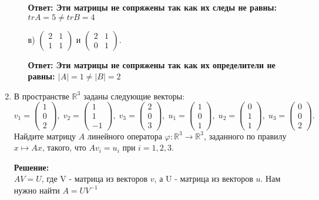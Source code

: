 \documentclass[a4paper,12pt]{article}
\newcounter{z}
\begin{document}
\begin{enumerate}
\begin{itemize}
\textbf{Ответ: Эти матрицы не сопряжены так как их следы не равны: $tr A = 5 \neq tr B = 4 $}


\item[в)] $\begin{pmatrix}{2}&{1}\\{1}&{1}\end{pmatrix}$ и $\begin{pmatrix}{2}&{1}\\{0}&{1}\end{pmatrix}$.

\textbf{Ответ: Эти матрицы не сопряжены так как их определители не равны: $|A| = 1 \neq |B| = 2 $}


\end{itemize}

\vspace{5pt}


\item В пространстве $\mathbb R^3$ заданы следующие векторы:
\[
v_1 =
\begin{pmatrix}
{1}\\{0}\\{2}
\end{pmatrix}
,\;
v_2 =
\begin{pmatrix}
{1}\\{1}\\{-1}
\end{pmatrix}
,\;
v_3 =
\begin{pmatrix}
{2}\\{0}\\{3}
\end{pmatrix}
,\;
u_1 =
\begin{pmatrix}
{1}\\{0}\\{1}
\end{pmatrix}
,\;
u_2 =
\begin{pmatrix}
{0}\\{1}\\{1}
\end{pmatrix}
,\;
u_3 =
\begin{pmatrix}
{0}\\{0}\\{2}
\end{pmatrix}.
\]
Найдите матрицу $A$ линейного оператора $\varphi\colon \mathbb R^3\to \mathbb R^3$, заданного по правилу $x\mapsto Ax$, такого, что $A v_i = u_i$ при $i = 1, 2, 3$. 

\vspace{5pt}

\textbf{Решение:}\\
$AV=U$, где V - матрица из векторов $v$, а U - матрица из векторов $u$. Нам нужно найти $A=UV^{-1}$


\end{enumerate}
\end{document}
